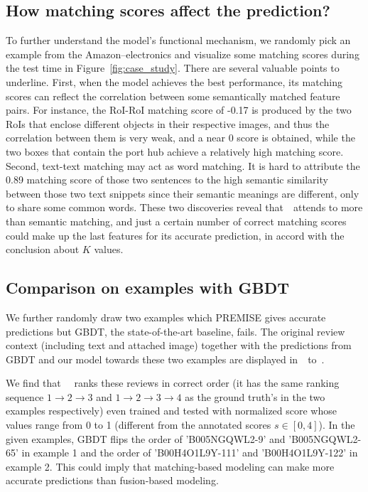 \subsection{How matching scores affect the prediction?}
To further understand the model's functional mechanism, we randomly pick an example from the Amazon--electronics and visualize some matching scores during the test time in Figure~\ref{fig:case_study}.
There are several valuable points to underline.
First, when the model achieves the best performance, its matching scores can reflect the correlation between some semantically matched feature pairs.
For instance, the RoI-RoI matching score of -0.17 is produced by the two RoIs that enclose different objects in their respective images, and thus the correlation between them is very weak, and a near 0 score is obtained, while the two boxes that contain the port hub achieve a relatively high matching score.
Second, text-text matching may act as word matching. 
It is hard to attribute the 0.89 matching score of those two sentences to the high semantic similarity between those two text snippets since their semantic meanings are different, only to share some common words.
These two discoveries reveal that~\modelname~attends to more than semantic matching, and just a certain number of correct matching scores could make up the last features for its accurate prediction, in accord with the conclusion about $K$ values. 

\subsection{Comparison on examples with GBDT}
We further randomly draw two examples which PREMISE gives accurate predictions but GBDT, the state-of-the-art baseline, fails. 
The original review context (including text and attached image) together with the predictions from GBDT and our model towards these two examples are displayed  in~~to~. 

We find that~\modelname~ ranks these reviews in correct order (it has the same ranking sequence $1\to 2 \to 3$  and $1 \to 2 \to 3 \to 4$ as the ground truth's in the two examples respectively) even trained and tested with normalized score whose values range from 0 to 1 (different from the annotated scores $s\in [0,4]$). In the given examples, GBDT flips the order of 'B005NGQWL2-9' and 'B005NGQWL2-65' in example 1 and the order of 'B00H4O1L9Y-111' and 'B00H4O1L9Y-122' in example 2.
This could imply that matching-based modeling can make more accurate predictions than fusion-based modeling.

